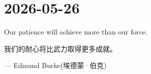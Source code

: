 \section*{2026-05-26}
Our patience will achieve more than our force. \par
我们的耐心将比武力取得更多成就。\par
\hfill --- Edmund Burke(埃德蒙·伯克)\par
